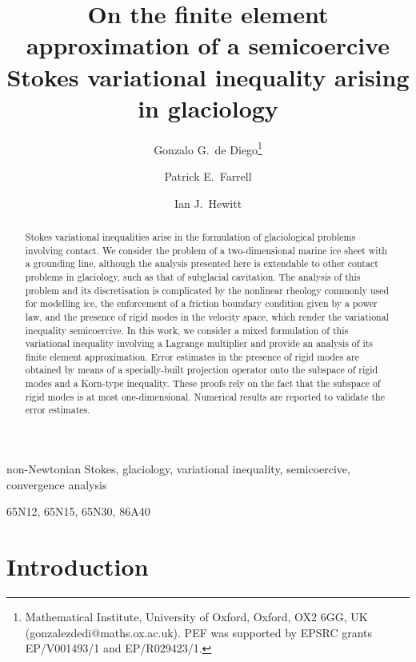 \documentclass[onefignum,onetabnum]{siamart190516}
\begin{document}
\title{On the finite element approximation of a semicoercive Stokes variational inequality arising in glaciology}

\author{Gonzalo G.~de Diego\thanks{Mathematical Institute, University of Oxford, Oxford, OX2 6GG, UK (gonzalezdedi@maths.ox.ac.uk). PEF was supported by EPSRC grants EP/V001493/1 and EP/R029423/1.} \and Patrick E.~Farrell\footnotemark[1] \and Ian J.~Hewitt\footnotemark[1]}

\maketitle

\begin{abstract}
	Stokes variational inequalities arise in the formulation of glaciological problems involving contact. We consider the problem of a two-dimensional marine ice sheet with a grounding line, although the analysis presented here is extendable to other contact problems in glaciology, such as that of subglacial cavitation. The analysis of this problem and its discretisation is complicated by the nonlinear rheology commonly used for modelling ice, the enforcement of a friction boundary condition given by a power law, and the presence of rigid modes in the velocity space, which render the variational inequality semicoercive. In this work, we consider a mixed formulation of this variational inequality involving a Lagrange multiplier and provide an analysis of its finite element approximation. Error estimates in the presence of rigid modes are obtained by means of a specially-built projection operator onto the subspace of rigid modes and a Korn-type inequality. These proofs rely on the fact that the subspace of rigid modes is at most one-dimensional. Numerical results are reported to validate the error estimates.
\end{abstract}

\begin{keywords}
  non-Newtonian Stokes, glaciology, variational inequality, semicoercive, convergence analysis
\end{keywords}

\begin{AMS}
  65N12, 65N15, 65N30, 86A40
\end{AMS}

\section{Introduction}\label{sec:intro}
\end{document}
